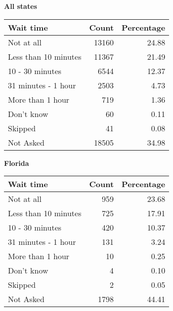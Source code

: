 \documentclass{beamer}
\begin{document}
                \begin{frame}
                  \textbf{All states}
                  \begin{table}[ht]
                    \centering
                    \begin{tabular}{lrr}
                      \hline
                  Wait time    & Count & Percentage \\ 
                      \hline
                      Not at all & 13160 & 24.88 \\ 
                      Less than 10 minutes & 11367 & 21.49 \\ 
                      10 - 30 minutes & 6544 & 12.37 \\ 
                      31 minutes - 1 hour & 2503 & 4.73 \\ 
                      More than 1 hour & 719 & 1.36 \\ 
                      Don't know & 60 & 0.11 \\ 
                      Skipped & 41 & 0.08 \\ 
                      Not Asked & 18505 & 34.98 \\ 
                      \hline
                    \end{tabular}
                  \end{table}            
                \end{frame}

                \begin{frame}
                  \textbf{Florida}
                  \begin{table}[ht]
                    \centering
                    \begin{tabular}{lrr}
                      \hline
                      Wait time & Count & Percentage \\ 
                      \hline
                      Not at all & 959 & 23.68 \\ 
                      Less than 10 minutes & 725 & 17.91 \\ 
                      10 - 30 minutes & 420 & 10.37 \\ 
                      31 minutes - 1 hour & 131 & 3.24 \\ 
                      More than 1 hour & 10 & 0.25 \\ 
                      Don't know & 4 & 0.10 \\ 
                      Skipped & 2 & 0.05 \\ 
                      Not Asked & 1798 & 44.41 \\ 
                      \hline
                    \end{tabular}
                  \end{table}
                \end{frame}
\end{document}
